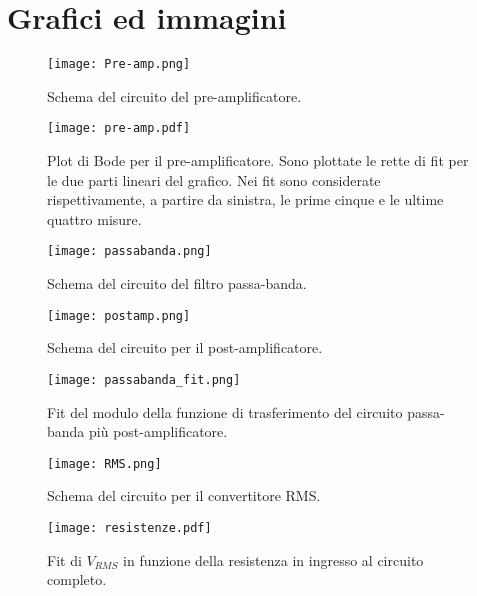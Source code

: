 \section{Grafici ed immagini}

\begin{figure}[h]
	\centering
	\texttt{[image: Pre-amp.png]}
	\caption{Schema del circuito del pre-amplificatore.}
	\label{f:Pre-amp}
\end{figure}

\begin{figure}[h]
	\centering
	\texttt{[image: pre-amp.pdf]}
	\caption{Plot di Bode per il pre-amplificatore. Sono plottate le rette di fit per le due parti lineari del grafico. Nei fit sono considerate rispettivamente, a partire da sinistra, le prime cinque e le ultime quattro misure.}
	\label{f:pre-amp}
\end{figure}

\begin{figure}[h]
	\centering
	\texttt{[image: passabanda.png]}
	\caption{Schema del circuito del filtro passa-banda.}
	\label{f:passabanda}
\end{figure}

\begin{figure}[h]
	\centering
	\texttt{[image: postamp.png]}
	\caption{Schema del circuito per il post-amplificatore.}
	\label{f:post-amp}
\end{figure}

\begin{figure}[h]
	\centering
	\texttt{[image: passabanda\_fit.png]}
	\caption{Fit del modulo della funzione di trasferimento del circuito passa-banda più post-amplificatore.}
	\label{f:passabanda_fit}
\end{figure}

\begin{figure}[h]
	\centering
	\texttt{[image: RMS.png]}
	\caption{Schema del circuito per il convertitore RMS.}
	\label{f:Convertitore}
\end{figure}

\begin{figure}[h]
	\centering
	\texttt{[image: resistenze.pdf]}
	\caption{Fit di $V_{RMS}$ in funzione della resistenza in ingresso al circuito completo.}
	\label{f:resistenze}
\end{figure}